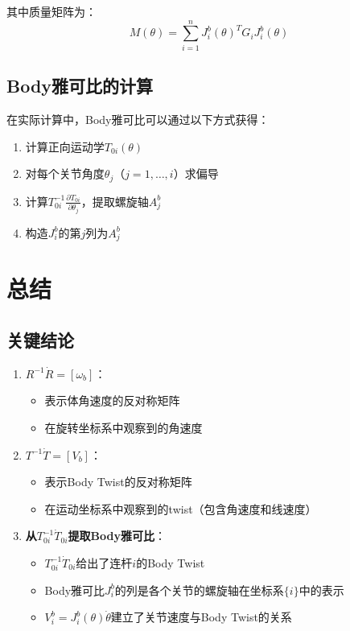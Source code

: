 \documentclass[12pt,a4paper]{article}
\begin{document}
其中质量矩阵为：
\begin{equation}
M(\theta) = \sum_{i=1}^{n} J_i^b(\theta)^T G_i J_i^b(\theta)
\end{equation}

\subsection{Body雅可比的计算}

在实际计算中，Body雅可比可以通过以下方式获得：

\begin{enumerate}
\item 计算正向运动学$T_{0i}(\theta)$
\item 对每个关节角度$\theta_j$（$j = 1, \ldots, i$）求偏导
\item 计算$T_{0i}^{-1} \frac{\partial T_{0i}}{\partial \theta_j}$，提取螺旋轴$A_j^b$
\item 构造$J_i^b$的第$j$列为$A_j^b$
\end{enumerate}

\section{总结}

\subsection{关键结论}

\begin{enumerate}
\item \textbf{$R^{-1}\dot{R} = [\omega_b]$}：
\begin{itemize}
\item 表示体角速度的反对称矩阵
\item 在旋转坐标系中观察到的角速度
\end{itemize}

\item \textbf{$T^{-1}\dot{T} = [V_b]$}：
\begin{itemize}
\item 表示Body Twist的反对称矩阵
\item 在运动坐标系中观察到的twist（包含角速度和线速度）
\end{itemize}

\item \textbf{从$T_{0i}^{-1}\dot{T}_{0i}$提取Body雅可比}：
\begin{itemize}
\item $T_{0i}^{-1}\dot{T}_{0i}$给出了连杆$i$的Body Twist
\item Body雅可比$J_i^b$的列是各个关节的螺旋轴在坐标系$\{i\}$中的表示
\item $V_i^b = J_i^b(\theta) \dot{\theta}$建立了关节速度与Body Twist的关系
\end{itemize}
\end{enumerate}
\end{document}
